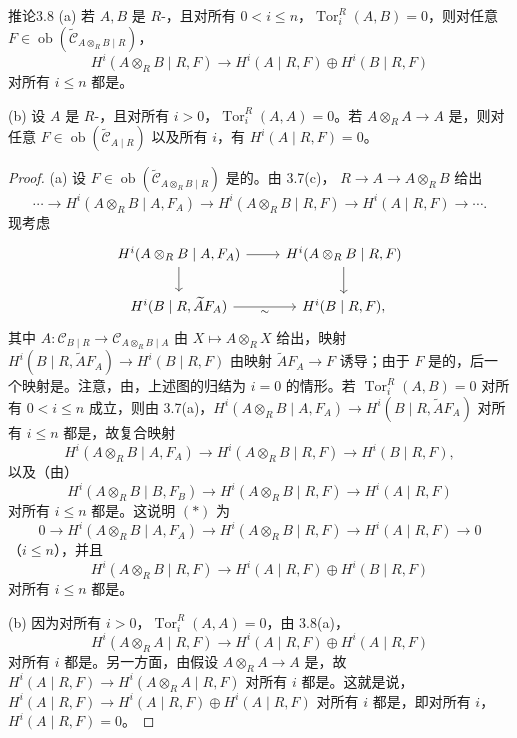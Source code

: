 \begin{SGAresult}{推论}{3.8}
(a) 若 $A,B$ 是 $R$-，且对所有 $0<i\leq n$，$\operatorname{Tor}_i^R(A,B)=0$，则对任意 $F\in\operatorname{ob}(\widetilde{\mathcal C}_{A\otimes_R B\mid R})$，
\[H^i(A\otimes_R B\mid R,F)\longrightarrow H^i(A\mid R,F)\oplus H^i(B\mid R,F)\]
对所有 $i\leq n$ 都是。

(b) 设 $A$ 是 $R$-，且对所有 $i>0$，$\operatorname{Tor}_i^R(A,A)=0$。若 $A\otimes_R A\to A$ 是，则对任意 $F\in\operatorname{ob}(\widetilde{\mathcal C}_{A\mid R})$ 以及所有 $i$，有 $H^i(A\mid R,F)=0$。
\end{SGAresult}
\begin{proof}
(a) 设 $F\in\operatorname{ob}(\widetilde{\mathcal C}_{A\otimes_R B\mid R})$ 是的。由 3.7(c)， $R\to A\to A\otimes_R B$ 给出
\[\cdots\to H^i(A\otimes_R B\mid A,F_A)\to H^i(A\otimes_R B\mid R,F)\to H^i(A\mid R,F)\to\cdots.\tag{*}\]
现考虑
\[
\begin{tikzcd}
H^i(A\otimes_R B\mid A,F_A)\arrow[r]\arrow[d]&H^i(A\otimes_R B\mid R,F)\arrow[d]\\
H^i(B\mid R,\widetilde AF_A)\arrow[r,"\sim"']&H^i(B\mid R,F),
\end{tikzcd}
\]
其中 $A:\mathcal C_{B\mid R}\to\mathcal C_{A\otimes_R B\mid A}$ 由 $X\mapsto A\otimes_R X$ 给出，映射 $H^i(B\mid R,\widetilde AF_A)\to H^i(B\mid R,F)$ 由映射 $\widetilde AF_A\to F$ 诱导；由于 $F$ 是的，后一个映射是。注意，由，上述图的归结为 $i=0$ 的情形。若 $\operatorname{Tor}_i^R(A,B)=0$ 对所有 $0<i\leq n$ 成立，则由 3.7(a)，$H^i(A\otimes_R B\mid A,F_A)\to H^i(B\mid R,\widetilde AF_A)$ 对所有 $i\leq n$ 都是，故复合映射
\[H^i(A\otimes_R B\mid A,F_A)\to H^i(A\otimes_R B\mid R,F)\to H^i(B\mid R,F),\]
以及（由）
\[H^i(A\otimes_R B\mid B,F_B)\to H^i(A\otimes_R B\mid R,F)\to H^i(A\mid R,F)\]
对所有 $i\leq n$ 都是。这说明 $(*)$ 为
\[0\to H^i(A\otimes_R B\mid A,F_A)\to H^i(A\otimes_R B\mid R,F)\to H^i(A\mid R,F)\to0\]
（$i\leq n$），并且
\[H^i(A\otimes_R B\mid R,F)\longrightarrow H^i(A\mid R,F)\oplus H^i(B\mid R,F)\]
对所有 $i\leq n$ 都是。

(b) 因为对所有 $i>0$，$\operatorname{Tor}_i^R(A,A)=0$，由 3.8(a)，
\[H^i(A\otimes_R A\mid R,F)\longrightarrow H^i(A\mid R,F)\oplus H^i(A\mid R,F)\]
对所有 $i$ 都是。另一方面，由假设 $A\otimes_R A\to A$ 是，故 $H^i(A\mid R,F)\to H^i(A\otimes_R A\mid R,F)$ 对所有 $i$ 都是。这就是说， $H^i(A\mid R,F)\to H^i(A\mid R,F)\oplus H^i(A\mid R,F)$ 对所有 $i$ 都是，即对所有 $i$，$H^i(A\mid R,F)=0$。
\end{proof}

